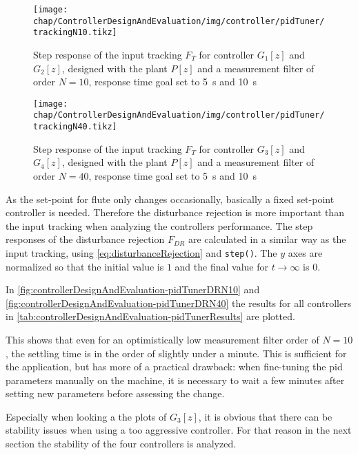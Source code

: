 \begin{figure}[tb]
	\centering
	\texttt{[image: chap/ControllerDesignAndEvaluation/img/controller/pidTuner/trackingN10.tikz]}
	\caption[Input tracking of controller one and two]{Step response of the input tracking $F_T$ for controller $G_1[z]$ and $G_2[z]$, designed with the plant $P[z]$ and a measurement filter of order $N=10$, response time goal set to \SI{5}{\second} and \SI{10}{\second}}
	\label{fig:controllerDesignAndEvaluation-pidTunerITN10}
\end{figure}

\begin{figure}[tb]
	\centering
	\texttt{[image: chap/ControllerDesignAndEvaluation/img/controller/pidTuner/trackingN40.tikz]}
	\caption[Input tracking of controller three and four]{Step response of the input tracking $F_T$ for controller $G_3[z]$ and $G_4[z]$, designed with the plant $P[z]$ and a measurement filter of order $N=40$, response time goal set to \SI{5}{\second} and \SI{10}{\second}}
	\label{fig:controllerDesignAndEvaluation-pidTunerITN40}
\end{figure}

As the set-point for \gls{flute} only changes occasionally, basically a fixed set-point controller is needed. Therefore the disturbance rejection is more important than the input tracking when analyzing the controllers performance. The step responses of the disturbance rejection $F_{DR}$ are calculated in a similar way as the input tracking, using \autoref{eq:disturbanceRejection} and \texttt{step()}. The $y$ axes are normalized so that the initial value is $1$ and the final value for $t \rightarrow \infty$ is $0$.

In \autoref{fig:controllerDesignAndEvaluation-pidTunerDRN10} and \autoref{fig:controllerDesignAndEvaluation-pidTunerDRN40} the results for all controllers in \autoref{tab:controllerDesignAndEvaluation-pidTunerResults} are plotted.

This shows that even for an optimistically low measurement filter order of $N=10$, the settling time is in the order of slightly under a minute. This is sufficient for the application, but has more of a practical drawback: when fine-tuning the \gls{pid} parameters manually on the machine, it is necessary to wait a few minutes after setting new parameters before assessing the change.

Especially when looking a the plots of $G_3[z]$, it is obvious that there can be stability issues when using a too aggressive controller. For that reason in the next section the stability of the four controllers is analyzed.

